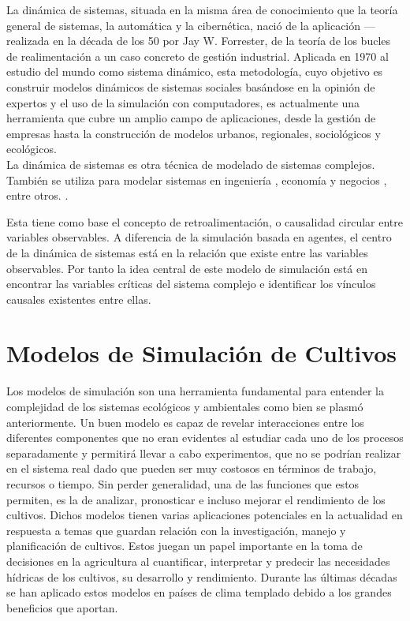 La dinámica de sistemas, situada en la misma área de conocimiento que la teoría general de sistemas, la automática y la cibernética, nació de la aplicación —realizada en la década de los 50 por Jay W. Forrester, de la teoría de los bucles de realimentación a un caso concreto de gestión industrial. Aplicada en 1970 al estudio del mundo como sistema dinámico,  esta metodología, cuyo objetivo es construir modelos dinámicos de sistemas sociales basándose en la opinión de expertos y el uso de la simulación con computadores, es actualmente una  herramienta que cubre un amplio campo de aplicaciones, desde la  gestión de empresas hasta la construcción de modelos urbanos, regionales, sociológicos y ecológicos. \parencite{aracil1997dinamica} \\

La dinámica de sistemas es otra técnica de modelado de sistemas complejos. También se utiliza para modelar sistemas en ingeniería \parencite{ford1997system, ford1998dynamic}, economía y negocios \parencite{bayer2004sterman, ellis2007impacto}, entre otros. \parencite{izquierdo2008modelado}.

Esta tiene como base el concepto de retroalimentación, o causalidad circular entre variables observables.
A diferencia de la simulación basada en agentes, el centro de la dinámica de sistemas está en la relación que existe entre las variables observables.
Por tanto la idea central de este modelo de simulación está en encontrar las variables críticas del sistema complejo e identificar los vínculos causales existentes entre ellas.

\section{Modelos de Simulación de Cultivos}

Los modelos de simulación son una herramienta fundamental para entender la complejidad de los sistemas ecológicos y ambientales como bien se plasmó anteriormente.
Un buen modelo es capaz de revelar interacciones entre los diferentes componentes que no eran evidentes al estudiar cada uno de los procesos separadamente y permitirá llevar a cabo experimentos, que no se podrían realizar en el sistema real dado que pueden ser muy costosos en términos de trabajo, recursos o tiempo.
Sin perder generalidad, una de las funciones que estos permiten, es la de analizar, pronosticar e incluso mejorar el rendimiento de los cultivos.
Dichos modelos tienen varias aplicaciones potenciales en la actualidad en respuesta a temas que guardan relación con la investigación, manejo y planificación de cultivos. Estos juegan un papel importante en la toma de decisiones en la agricultura al cuantificar, interpretar y predecir las necesidades hídricas de los cultivos, su desarrollo y rendimiento. \parencite{granmaEMFord}
Durante las últimas décadas se han aplicado estos modelos en países de clima templado debido a los grandes beneficios que aportan.\\

